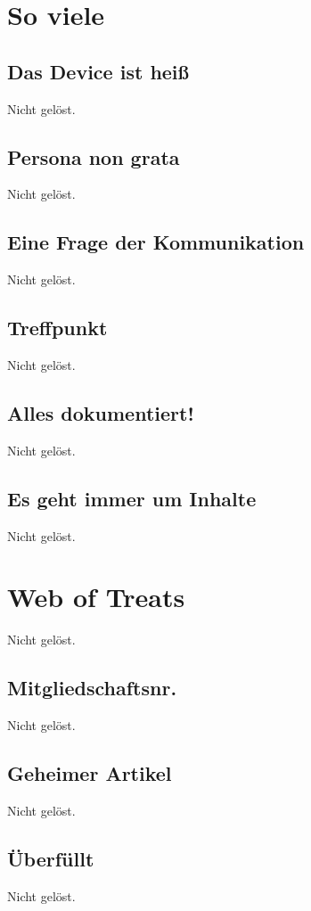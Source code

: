 \documentclass[12pt, a4paper, titlepage, oneside]{scrartcl}
\begin{document}
	\section{So viele}

	\subsection{Das Device ist heiß}
	Nicht gelöst.

	\subsection{Persona non grata}
	Nicht gelöst.

	\subsection{Eine Frage der Kommunikation}
	Nicht gelöst.

	\subsection{Treffpunkt}
	Nicht gelöst.

	\subsection{Alles dokumentiert!}
	Nicht gelöst.

	\subsection{Es geht immer um Inhalte}
	Nicht gelöst.

	\section{Web of Treats}
	Nicht gelöst.

	\subsection{Mitgliedschaftsnr.}
	Nicht gelöst.

	\subsection{Geheimer Artikel}
	Nicht gelöst.

	\subsection{\"Uberf\"ullt}
	Nicht gelöst.
\end{document}
